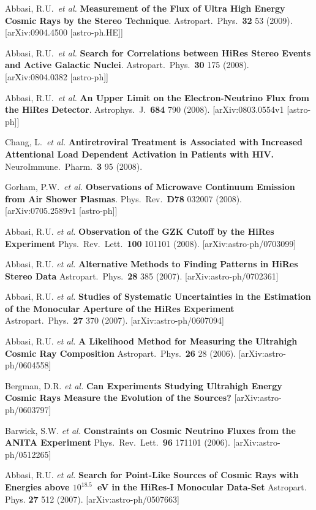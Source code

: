 \begin{resume}
Abbasi, R.U.\ {\it et al.} {\bf Measurement of the Flux of Ultra High Energy Cosmic Rays by the Stereo Technique}.  Astropart.\ Phys.\ {\bf 32} 53 (2009). [arXiv:0904.4500 [astro-ph.HE]] 

Abbasi, R.U.\ {\it et al.} {\bf Search for Correlations between HiRes Stereo Events and Active Galactic Nuclei}. Astropart.\ Phys.\ {\bf 30} 175 (2008).
[arXiv:0804.0382 [astro-ph]]

Abbasi, R.U.\ {\it et al.} {\bf An Upper Limit on the Electron-Neutrino Flux
from the HiRes Detector}. Astrophys.\ J.\ {\bf 684} 790 (2008). 
[arXiv:0803.0554v1 [astro-ph]]

Chang, L.\ {\it et al.} {\bf Antiretroviral Treatment is Associated with 
Increased Attentional Load Dependent Activation in Patients with HIV.} NeuroImmune.\ Pharm.\ {\bf 3} 95 (2008). 

Gorham, P.W.\ {\it et al.} {\bf Observations of Microwave Continuum Emission 
from Air Shower Plasmas}. Phys.\ Rev.\ {\bf D78} 032007 (2008).
[arXiv:0705.2589v1 [astro-ph]]

Abbasi, R.U. {\it et al.} {\bf Observation of the GZK Cutoff by the HiRes
Experiment} Phys.\ Rev.\ Lett.\ {\bf 100} 101101 (2008).
[arXiv:astro-ph/0703099]

Abbasi, R.U. {\it et al.} {\bf Alternative Methods to Finding Patterns in 
HiRes Stereo Data} Astropart.\ Phys.\ {\bf 28} 385 (2007).
[arXiv:astro-ph/0702361]

Abbasi, R.U. {\it et al.} {\bf Studies of Systematic Uncertainties in the 
Estimation of the Monocular Aperture of the HiRes Experiment} Astropart.\ 
Phys.\ {\bf 27} 370 (2007). 
[arXiv:astro-ph/0607094]

Abbasi, R.U. {\it et al.} {\bf A Likelihood Method for Measuring the 
Ultrahigh Cosmic Ray Composition} Astropart.\ Phys.\ {\bf 26} 28 (2006). 
[arXiv:astro-ph/0604558]

Bergman, D.R. {\it et al.}  {\bf Can Experiments Studying Ultrahigh Energy
Cosmic Rays Measure the Evolution of the Sources?} [arXiv:astro-ph/0603797]

Barwick, S.W. {\it et al.}  {\bf Constraints on Cosmic Neutrino Fluxes from the
ANITA Experiment} Phys.\ Rev.\ Lett.\ {\bf 96} 171101 (2006).
[arXiv:astro-ph/0512265]

Abbasi, R.U. {\it et al.}  {\bf Search for Point-Like Sources of Cosmic Rays 
with Energies above \boldmath$10^{18.5}$~eV in the HiRes-I Monocular Data-Set} 
Astropart. Phys. {\bf 27} 512 (2007). 
[arXiv:astro-ph/0507663]


\end{resume}
